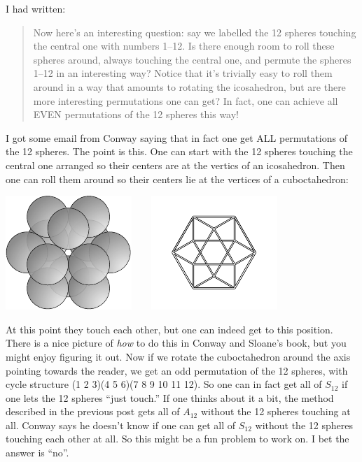 I had written:
\begin{quote}
Now here's an interesting question: say we labelled the 12 spheres touching the central one with numbers 1--12. Is there enough room to roll these spheres around, always touching the central one, and permute the spheres 1--12 in an interesting way? Notice that it's trivially easy to roll them around in a way that amounts to rotating the icosahedron, but are there more interesting permutations one can get?
In fact, one can achieve all EVEN permutations of the 12 spheres this way!
\end{quote}
I got some email from Conway saying that in fact one get ALL permutations of the 12 spheres. The point is this. One can start with the 12 spheres touching the central one arranged so their centers are at the vertics of an icosahedron. Then one can roll them around so their centers lie at the vertices of a cuboctahedron:
\begin{center}
\includegraphics[]{figures/wk20_fig5.pdf}\ \ \ \ 
\includegraphics[]{figures/wk20_fig10.pdf}
\end{center}
%
% 
%
%
At this point they touch each other, but one can indeed get to this position. There is a nice picture of \emph{how} to do this in Conway and Sloane's book, but you might enjoy figuring it out.
Now if we rotate the cuboctahedron around the axis pointing towards the reader, we get an odd permutation of the 12 spheres, with cycle structure (1 2 3)(4 5 6)(7 8 9 10 11 12). So one can in fact get all of $S_{12}$ if one lets the 12 spheres ``just touch.'' If one thinks about it a bit, the method described in the previous post gets all of $A_{12}$ without the 12 spheres touching at all. Conway says he doesn't know if one can get all of $S_{12}$ without the 12 spheres touching each other at all. So this might be a fun problem to work on. I bet the answer is ``no''.

